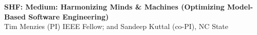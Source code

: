 \documentclass[twoside]{NSF}
\newcommand{\TITLE}{SHF: Medium: Harmonizing Minds \& Machines (Optimizing Model-Based Software Engineering)}
\begin{document}
\begin{nsfdescription}
 \begin{center}
{\bf \TITLE}\\
{Tim Menzies (PI) IEEE Fellow; and Sandeep Kuttal (co-PI), NC State}
 \end{center}





 
  

 
 


\end{nsfdescription}
\end{document}
